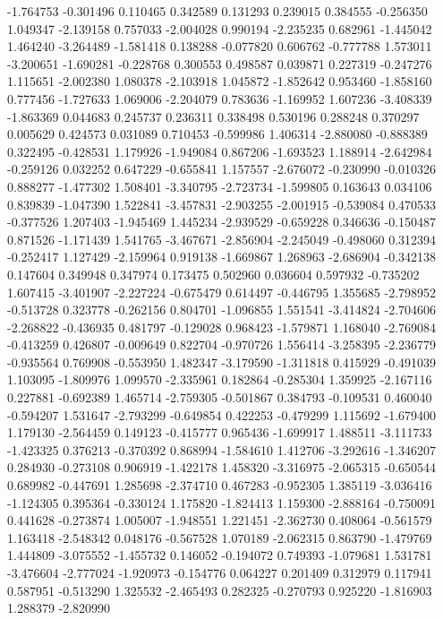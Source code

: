 -1.764753
-0.301496
0.110465
0.342589
0.131293
0.239015
0.384555
-0.256350
1.049347
-2.139158
0.757033
-2.004028
0.990194
-2.235235
0.682961
-1.445042
1.464240
-3.264489
-1.581418
0.138288
-0.077820
0.606762
-0.777788
1.573011
-3.200651
-1.690281
-0.228768
0.300553
0.498587
0.039871
0.227319
-0.247276
1.115651
-2.002380
1.080378
-2.103918
1.045872
-1.852642
0.953460
-1.858160
0.777456
-1.727633
1.069006
-2.204079
0.783636
-1.169952
1.607236
-3.408339
-1.863369
0.044683
0.245737
0.236311
0.338498
0.530196
0.288248
0.370297
0.005629
0.424573
0.031089
0.710453
-0.599986
1.406314
-2.880080
-0.888389
0.322495
-0.428531
1.179926
-1.949084
0.867206
-1.693523
1.188914
-2.642984
-0.259126
0.032252
0.647229
-0.655841
1.157557
-2.676072
-0.230990
-0.010326
0.888277
-1.477302
1.508401
-3.340795
-2.723734
-1.599805
0.163643
0.034106
0.839839
-1.047390
1.522841
-3.457831
-2.903255
-2.001915
-0.539084
0.470533
-0.377526
1.207403
-1.945469
1.445234
-2.939529
-0.659228
0.346636
-0.150487
0.871526
-1.171439
1.541765
-3.467671
-2.856904
-2.245049
-0.498060
0.312394
-0.252417
1.127429
-2.159964
0.919138
-1.669867
1.268963
-2.686904
-0.342138
0.147604
0.349948
0.347974
0.173475
0.502960
0.036604
0.597932
-0.735202
1.607415
-3.401907
-2.227224
-0.675479
0.614497
-0.446795
1.355685
-2.798952
-0.513728
0.323778
-0.262156
0.804701
-1.096855
1.551541
-3.414824
-2.704606
-2.268822
-0.436935
0.481797
-0.129028
0.968423
-1.579871
1.168040
-2.769084
-0.413259
0.426807
-0.009649
0.822704
-0.970726
1.556414
-3.258395
-2.236779
-0.935564
0.769908
-0.553950
1.482347
-3.179590
-1.311818
0.415929
-0.491039
1.103095
-1.809976
1.099570
-2.335961
0.182864
-0.285304
1.359925
-2.167116
0.227881
-0.692389
1.465714
-2.759305
-0.501867
0.384793
-0.109531
0.460040
-0.594207
1.531647
-2.793299
-0.649854
0.422253
-0.479299
1.115692
-1.679400
1.179130
-2.564459
0.149123
-0.415777
0.965436
-1.699917
1.488511
-3.111733
-1.423325
0.376213
-0.370392
0.868994
-1.584610
1.412706
-3.292616
-1.346207
0.284930
-0.273108
0.906919
-1.422178
1.458320
-3.316975
-2.065315
-0.650544
0.689982
-0.447691
1.285698
-2.374710
0.467283
-0.952305
1.385119
-3.036416
-1.124305
0.395364
-0.330124
1.175820
-1.824413
1.159300
-2.888164
-0.750091
0.441628
-0.273874
1.005007
-1.948551
1.221451
-2.362730
0.408064
-0.561579
1.163418
-2.548342
0.048176
-0.567528
1.070189
-2.062315
0.863790
-1.479769
1.444809
-3.075552
-1.455732
0.146052
-0.194072
0.749393
-1.079681
1.531781
-3.476604
-2.777024
-1.920973
-0.154776
0.064227
0.201409
0.312979
0.117941
0.587951
-0.513290
1.325532
-2.465493
0.282325
-0.270793
0.925220
-1.816903
1.288379
-2.820990
